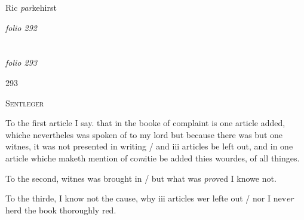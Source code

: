 \documentclass[12pt, a4paper]{book}
\begin{document}
		\ifthenelse{\isodd{\thepage}}
		{\reversemarginpar}
		{\normalmarginpar}
		Ric \textit{par}kehirst

\dotfill
						\newpage
{}

\textit{folio 292}


         \vspace*{4cm}
         
\dotfill
						  \section*{}  \subsection*{}

\textit{folio 293}



            		\begin{flushright}{\color{Mahogany}293}\end{flushright}


				\begin{center} \begin{large} {\scshape Sentleger} \end{large} \end{center}
			


				\marginpar[\vspace{0.5cm}{\textcolor{Gray}{ff.}}]{}
			
            		
		\ifthenelse{\isodd{\thepage}}
		{\reversemarginpar}
		{\normalmarginpar}
		To the first article I say. that in the booke of complaint is one
article added, whiche nevertheles was spoken of to my lord
but because there was but one witnes, it was not presented
in writing / and iii articles be left out, and in one article
whiche maketh mention of co\textit{m}itie be added thies wourdes,
of all thinges. 
            		
            		
		\ifthenelse{\isodd{\thepage}}
		{\reversemarginpar}
		{\normalmarginpar}
		To the second, witnes was brought in / but what was \textit{pro}ved
I knowe not. 
            		
		\ifthenelse{\isodd{\thepage}}
		{\reversemarginpar}
		{\normalmarginpar}
		To the thirde, I know not the cause, why iii articles
wer lefte out / nor I nev\textit{er }herd the book thoroughly red.
            		
\end{document}
